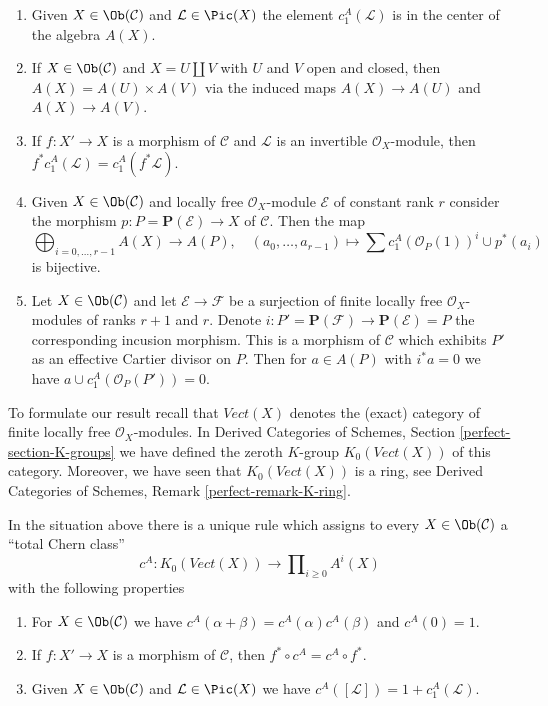 \begin{enumerate}
\item Given $X \in \Ob(\mathcal{C})$ and $\mathcal{L} \in \Pic(X)$
the element $c_1^A(\mathcal{L})$ is in the center of the algebra $A(X)$.
\item If $X \in \Ob(\mathcal{C})$ and $X = U \amalg V$ with $U$ and $V$
open and closed, then $A(X) = A(U) \times A(V)$ via the induced maps
$A(X) \to A(U)$ and $A(X) \to A(V)$.
\item If $f : X' \to X$ is a morphism of $\mathcal{C}$ and $\mathcal{L}$
is an invertible $\mathcal{O}_X$-module, then $f^*c_1^A(\mathcal{L}) =
c_1^A(f^*\mathcal{L})$.
\item Given $X \in \Ob(\mathcal{C})$ and locally free $\mathcal{O}_X$-module
$\mathcal{E}$ of constant rank $r$ consider the morphism
$p : P = \mathbf{P}(\mathcal{E}) \to X$ of $\mathcal{C}$.
Then the map
$$
\bigoplus\nolimits_{i = 0, \ldots, r - 1} A(X)
\longrightarrow A(P),\quad
(a_0, \ldots, a_{r - 1}) \longmapsto
\sum c_1^A(\mathcal{O}_P(1))^i \cup p^*(a_i)
$$
is bijective.
\item Let $X \in \Ob(\mathcal{C})$ and let $\mathcal{E} \to \mathcal{F}$
be a surjection of finite locally free $\mathcal{O}_X$-modules
of ranks $r + 1$ and $r$. Denote
$i : P' = \mathbf{P}(\mathcal{F}) \to \mathbf{P}(\mathcal{E}) = P$ the
corresponding incusion morphism. This is a morphism of $\mathcal{C}$
which exhibits $P'$ as an effective Cartier divisor on $P$. Then for
$a \in A(P)$ with $i^*a = 0$ we have
$a \cup c_1^A(\mathcal{O}_P(P')) = 0$.
\end{enumerate}
To formulate our result recall that $\textit{Vect}(X)$ denotes the
(exact) category of finite locally free $\mathcal{O}_X$-modules.
In Derived Categories of Schemes, Section \ref{perfect-section-K-groups}
we have defined the zeroth $K$-group
$K_0(\textit{Vect}(X))$ of this category.
Moreover, we have seen that $K_0(\textit{Vect}(X))$ is a ring, see
Derived Categories of Schemes, Remark \ref{perfect-remark-K-ring}.

\begin{proposition}
\label{proposition-chern-class}
In the situation above there is a unique rule which assigns to
every $X \in \Ob(\mathcal{C})$ a ``total Chern class''
$$
c^A : K_0(\textit{Vect}(X)) \longrightarrow  \prod\nolimits_{i \geq 0} A^i(X)
$$
with the following properties
\begin{enumerate}
\item For $X \in \Ob(\mathcal{C})$ we have
$c^A(\alpha + \beta) = c^A(\alpha) c^A(\beta)$
and $c^A(0) = 1$.
\item If $f : X' \to X$ is a morphism of $\mathcal{C}$, then
$f^* \circ c^A =  c^A \circ f^*$.
\item Given $X \in \Ob(\mathcal{C})$ and $\mathcal{L} \in \Pic(X)$
we have $c^A([\mathcal{L}]) = 1 + c_1^A(\mathcal{L})$.
\end{enumerate}
\end{proposition}

